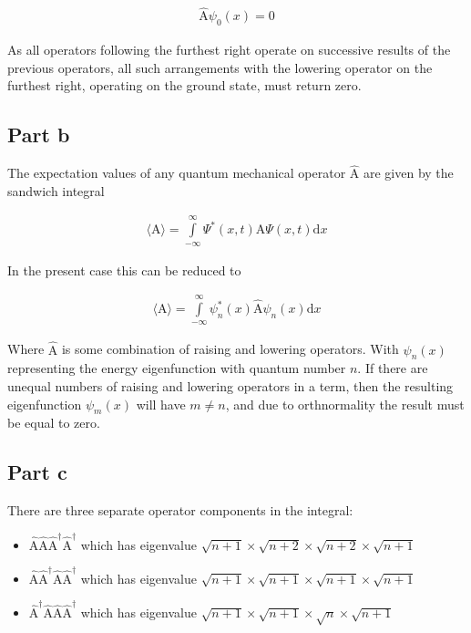 \documentclass[paper=a4, fontsize=11pt]{scrartcl} %
\numberwithin{equation}{section} %
\numberwithin{figure}{section} %
\numberwithin{table}{section} %
\begin{document}
\begin{align}
\hat{\textrm{A}}\psi_0 (x) = 0
\end{align}

As all operators following the furthest right operate on successive results of the previous operators, all such arrangements with the lowering operator on the furthest right, operating on the ground state, must return zero.

\subsection{Part b}
The expectation values of any quantum mechanical operator $\hat{\textrm{A}}$ are given by the sandwich integral

\begin{align}
\langle \textrm{A} \rangle =
\int\limits_{-\infty}^{\infty}\Psi^*\left(x,t\right) \hat{\textrm{A}} \Psi\left(x,t\right) \mathrm{d}x
\end{align}

In the present case this can be reduced to

\begin{align}
\langle \textrm{A} \rangle =
\int\limits_{-\infty}^{\infty}\psi^*_n\left(x\right) \hat{\textrm{A}} \psi_n\left(x\right) \mathrm{d}x
\end{align}

Where $\hat{\textrm{A}}$ is some combination of raising and lowering operators. With $\psi_n(x)$ representing the energy eigenfunction with quantum number $n$. If there are unequal numbers of raising and lowering operators in a term, then the resulting eigenfunction $\psi_m(x)$ will have $m \neq n$, and due to orthnormality the result must be equal to zero.

\subsection{Part c}
There are three separate operator components in the integral:\begin{itemize}
\item{
 $\hat{\textrm{A}}\hat{\textrm{A}}
\hat{\textrm{A}}^{\dagger}\hat{\textrm{A}}^{\dagger}$
which has eigenvalue $\sqrt{n+1}\times \sqrt{n+2}\times \sqrt{n+2}\times \sqrt{n+1}$}
\item{
$\hat{\textrm{A}}\hat{\textrm{A}}^{\dagger}
\hat{\textrm{A}}\hat{\textrm{A}}^{\dagger}$
which has eigenvalue $\sqrt{n+1}\times \sqrt{n+1}\times \sqrt{n+1}\times \sqrt{n+1}$}
\item{
$\hat{\textrm{A}}^{\dagger}\hat{\textrm{A}}
\hat{\textrm{A}}\hat{\textrm{A}}^{\dagger}$
which has eigenvalue $\sqrt{n+1}\times \sqrt{n+1}\times \sqrt{n}\times \sqrt{n+1}$}

\end{itemize}
\end{document}
